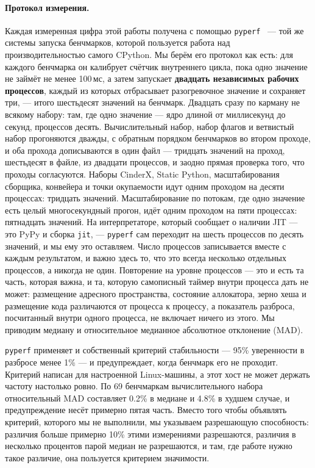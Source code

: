 \documentclass[10pt,a4paper]{article}
\newcommand{\meas}[2]{#2}
\newcommand{\code}[1]{\texttt{\small #1}}
\begin{document}
\paragraph{Протокол измерения.}
Каждая измеренная цифра этой работы получена с помощью \code{pyperf}~\cite{pyperf} --- той же
системы запуска бенчмарков, которой пользуется работа над производительностью самого CPython. Мы берём его
протокол как есть: для каждого бенчмарка он калибрует счётчик внутреннего цикла, пока одно значение
не займёт не менее 100\,мс, а затем запускает \textbf{двадцать независимых рабочих процессов},
каждый из которых отбрасывает разогревочное значение и сохраняет три, --- итого шестьдесят значений
на бенчмарк. Двадцать сразу по карману не всякому набору: там, где одно значение --- ядро длиной
от миллисекунд до секунд, процессов десять. Вычислительный набор, набор флагов и ветвистый
набор прогоняются дважды, с обратным порядком бенчмарков во втором проходе, и оба прохода
дописываются в один файл --- тридцать значений на проход, шестьдесят в файле, из двадцати
процессов, и заодно прямая проверка того, что проходы согласуются. Наборы CinderX, Static
Python, масштабирования сборщика, конвейера и точки окупаемости идут одним проходом на десяти
процессах: тридцать значений. Масштабирование по потокам, где одно значение есть целый многосекундный прогон, идёт
одним проходом на пяти процессах: пятнадцать значений. На интерпретаторе, который сообщает о
наличии JIT --- это PyPy и сборка \code{jit}, --- \code{pyperf} сам переходит на шесть процессов
по десять значений, и мы ему это оставляем.
Число процессов записывается вместе с каждым результатом, и важно здесь то, что это всегда
несколько отдельных процессов, а никогда не один. Повторение на уровне процессов --- это и есть та
часть, которая важна, и та, которую самописный таймер внутри процесса дать не может: размещение
адресного пространства, состояние аллокатора, зерно хеша и размещение кода различаются от процесса к
процессу, а показатель разброса, посчитанный внутри одного процесса, не включает ничего из этого.
Мы приводим медиану и относительное медианное абсолютное отклонение (MAD).

\code{pyperf} применяет и собственный критерий стабильности --- 95\% уверенности в разбросе менее
1\% --- и предупреждает, когда бенчмарк его не проходит. Критерий написан для настроенной Linux-машины, а этот хост не может держать частоту настолько
ровно. По 69 бенчмаркам вычислительного набора относительный MAD составляет \meas{mad:b1_compute-pypy311:arraysum/rust_ctypes}{0.2}\% в
медиане и \meas{mad:b1_compute-pypy311:call_overhead/cython}{4.8}\% в худшем случае, и предупреждение несёт примерно пятая часть. Вместо того чтобы
объявлять критерий, которого мы не выполнили, мы указываем разрешающую способность: различия
больше примерно 10\% этими измерениями разрешаются, различия в несколько процентов парой медиан не
разрешаются, и там, где работе нужно такое различие, она пользуется критерием значимости.
\end{document}
